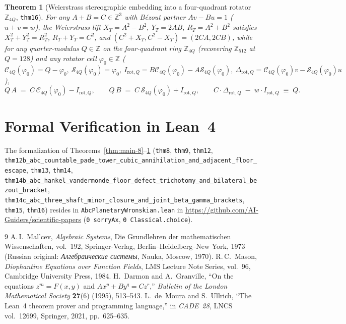 \documentclass[11pt,a4paper]{article}
\theoremstyle{plain}
\newtheorem{theorem}{Theorem}[section]
\theoremstyle{definition}
\begin{document}
\begin{theorem}[Weierstrass stereographic embedding into a four-quadrant rotator $\mathbb{Z}_{4Q}$, \texttt{thm16}]
\label{thm:main-12-16}
For any $A+B=C\in\mathbb{Z}^3$ with B\'ezout partner $A v - B u = 1$ ($u+v=w$), the Weierstrass lift $X_T = A^2-B^2,\ Y_T = 2AB,\ R_T = A^2+B^2$ satisfies $X_T^2+Y_T^2=R_T^2$, $R_T+Y_T=C^2$, and $(C^2+X_T,C^2-X_T)=(2CA,2CB)$, while for any quarter-modulus $Q\in\mathbb{Z}$ on the four-quadrant ring $\mathbb{Z}_{4Q}$ (recovering $\mathbb{Z}_{512}$ at $Q = 128$) and any rotator cell $\varphi_0\in\mathbb{Z}$ ($\mathcal{C}_{4Q}(\varphi_0)=Q-\varphi_0,\ \mathcal{S}_{4Q}(\varphi_0)=\varphi_0,\ I_{\mathrm{rot},Q} = B\mathcal{C}_{4Q}(\varphi_0)-A\mathcal{S}_{4Q}(\varphi_0),\ \Delta_{\mathrm{rot},Q} = \mathcal{C}_{4Q}(\varphi_0)v-\mathcal{S}_{4Q}(\varphi_0)u$),
\begin{equation}
  \label{eq:quarter-ring-invariant}
  Q\,A \;=\; C\,\mathcal{C}_{4Q}(\varphi_0) - I_{\mathrm{rot},Q},\qquad
  Q\,B \;=\; C\,\mathcal{S}_{4Q}(\varphi_0) + I_{\mathrm{rot},Q},\qquad
  C\cdot\Delta_{\mathrm{rot},Q} \;-\; w\cdot I_{\mathrm{rot},Q} \;\equiv\; Q.
\end{equation}
\end{theorem}

\section{Formal Verification in Lean~4}
\label{sec:lean4}

The formalization of Theorems~\ref{thm:main-8}--\ref{thm:main-12-16} (\texttt{thm8}, \texttt{thm9}, \texttt{thm12}, \texttt{thm12b\_abc\_countable\_pade\_tower\_cubic\_annihilation\_and\_adjacent\_floor\_escape}, \texttt{thm13}, \texttt{thm14}, \texttt{thm14b\_abc\_hankel\_vandermonde\_floor\_defect\_trichotomy\_and\_bilateral\_bezout\_bracket}, \texttt{thm14c\_abc\_three\_shaft\_minor\_closure\_and\_joint\_beta\_gamma\_brackets}, \texttt{thm15}, \texttt{thm16}) resides in \texttt{AbcPlanetaryWronskian.lean} in \url{https://github.com/AI-Guiders/scientific-papers} (\texttt{0 sorryAx}, \texttt{0 Classical.choice}).

\begin{thebibliography}{9}
A.\,I.~Mal'cev, \emph{Algebraic Systems}, Die Grundlehren der mathematischen Wissenschaften, vol.~192, Springer-Verlag, Berlin--Heidelberg--New York, 1973 (Russian original: \emph{Алгебраические системы}, Nauka, Moscow, 1970).
R.\,C.~Mason, \emph{Diophantine Equations over Function Fields}, LMS Lecture Note Series, vol.~96, Cambridge University Press, 1984.
H.~Darmon and A.~Granville, ``On the equations $z^m = F(x,y)$ and $Ax^p + By^q = Cz^r$,'' \emph{Bulletin of the London Mathematical Society} \textbf{27}(6) (1995), 513--543.
L.~de~Moura and S.~Ullrich, ``The Lean~4 theorem prover and programming language,'' in \emph{CADE~28}, LNCS vol.~12699, Springer, 2021, pp.~625--635.
\end{thebibliography}
\end{document}

